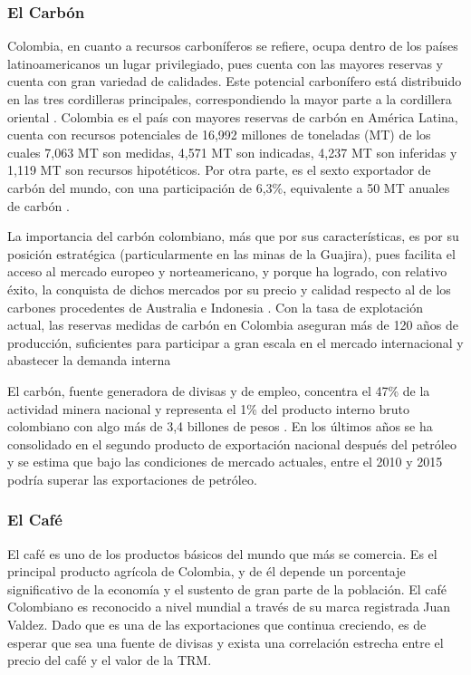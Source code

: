 \begin{spacing}{1.5}
\subsubsection{El Carbón}
Colombia, en cuanto a recursos carboníferos se refiere, ocupa dentro de los países latinoamericanos un lugar privilegiado, pues cuenta con las mayores reservas y cuenta con gran variedad de calidades. Este potencial carbonífero está distribuido en las tres cordilleras principales, correspondiendo la mayor parte a la cordillera oriental \cite{cardenas}. Colombia es el país con mayores reservas de carbón en América Latina, cuenta con recursos potenciales de 16,992 millones de toneladas (MT) de los cuales 7,063 MT son medidas, 4,571 MT son indicadas, 4,237 MT son inferidas y 1,119 MT son recursos hipotéticos. Por otra parte, es el sexto exportador de carbón del mundo, con una participación de 6,3\%, equivalente a 50 MT anuales de carbón \cite{carbonMain}. 

La importancia del carbón colombiano, más que por sus características, es por su posición estratégica (particularmente en las minas de la Guajira), pues facilita el acceso al mercado europeo y norteamericano, y porque ha logrado, con relativo éxito, la conquista de dichos mercados por su precio y calidad respecto al de los carbones procedentes de Australia e Indonesia \cite{cardenas}. Con la tasa de explotación actual, las reservas medidas de carbón en Colombia aseguran más de 120 años de producción, suficientes para participar a gran escala en el mercado internacional y abastecer la demanda interna \cite{carbonMain}

El carbón, fuente generadora de divisas y de empleo, concentra el 47\% de la actividad minera nacional y representa el 1\% del producto interno bruto colombiano con algo más de 3,4 billones de pesos \cite{carbonMain}. En los últimos años se ha consolidado en el segundo producto de exportación nacional  después del petróleo y se estima que bajo las condiciones de mercado actuales, entre el 2010 y 2015 podría superar las exportaciones de petróleo.

\subsubsection{El Café}
El café es uno de los productos básicos del mundo que más se comercia. Es el principal producto agrícola de Colombia, y de él depende un porcentaje significativo de la economía y el sustento de gran parte de la población. El café Colombiano es reconocido a nivel mundial a través de su marca registrada Juan Valdez. Dado que es una de las exportaciones que continua creciendo, es de esperar que sea una fuente de divisas y exista una correlación estrecha entre el precio del café y el valor de la TRM. 


\end{spacing}
